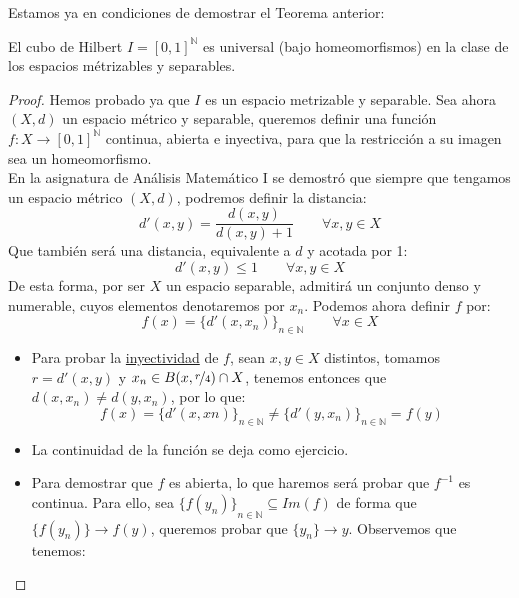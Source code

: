 Estamos ya en condiciones de demostrar el Teorema anterior:
\begin{teo}
    El cubo de Hilbert $I = {[0,1]}^{\mathbb{N}}$ es universal (bajo homeomorfismos) en la clase de los espacios métrizables y separables.
    \begin{proof}
        Hemos probado ya que $I$ es un espacio metrizable y separable. Sea ahora $(X,d)$ un espacio métrico y separable, queremos definir una función $f:X\to {[0,1]}^{\mathbb{N}}$ continua, abierta e inyectiva, para que la restricción a su imagen sea un homeomorfismo.\\

        \noindent
        En la asignatura de Análisis Matemático I se demostró que siempre que tengamos un espacio métrico $(X,d)$, podremos definir la distancia:
        \begin{equation*}
            d'(x,y) = \dfrac{d(x,y)}{d(x,y) + 1} \qquad \forall x,y\in X
        \end{equation*}
        Que también será una distancia, equivalente a $d$ y acotada por 1:
        \begin{equation*}
            d'(x,y) \leq 1 \qquad \forall x,y\in X
        \end{equation*}
        De esta forma, por ser $X$ un espacio separable, admitirá un conjunto denso y numerable, cuyos elementos denotaremos por $x_n$. Podemos ahora definir $f$ por:
        \begin{equation*}
            f(x) = {\{d'(x, x_n)\}}_{n\in \mathbb{N}} \qquad \forall x\in X
        \end{equation*}
        \begin{itemize}
            \item Para probar la \underline{inyectividad} de $f$, sean $x,y\in X$ distintos, tomamos $r = d'(x,y)$ y $x_n\in B(x,\nicefrac{r}{4})\cap X$, tenemos entonces que $d(x,x_n) \neq d(y,x_n)$, por lo que:
                \begin{equation*}
                    f(x) = {\{d'(x,xn)\}}_{n\in \mathbb{N}} \neq {\{d'(y,x_n)\}}_{n\in \mathbb{N}} = f(y)
                \end{equation*}
            \item La continuidad de la función se deja como ejercicio.
            \item Para demostrar que $f$ es abierta, lo que haremos será probar que $f^{-1}$ es continua. Para ello, sea ${\{f(y_n)\}}_{n\in \mathbb{N}} \subseteq Im(f)$ de forma que $\{f(y_n)\} \to f(y)$, queremos probar que $\{y_n\}\to y$. Observemos que tenemos:

\end{itemize}
\end{proof}
\end{teo}
